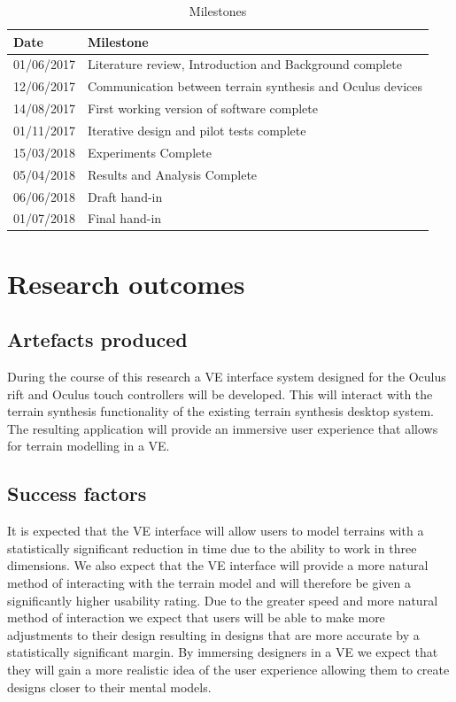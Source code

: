 \documentclass{sig-alternate-05-2015}
\begin{document}
\begin{table}[H]
	\centering
	\begin{tabular}{m{2cm} |m{4cm}}
		Date & Milestone\\ \hline
		01/06/2017 & Literature review, Introduction and Background complete\\
		12/06/2017 & Communication between terrain synthesis and Oculus devices\\
		14/08/2017 & First working version of software complete\\
		01/11/2017 & Iterative design and pilot tests complete \\
		15/03/2018 & Experiments Complete\\
		05/04/2018 & Results and Analysis Complete\\
		06/06/2018 & Draft hand-in\\
		01/07/2018 & Final hand-in		
	\end{tabular}
\caption{Milestones}
\end{table}
\section{Research outcomes}
\subsection{Artefacts produced}
During the course of this research a VE interface system designed for the Oculus rift and Oculus touch controllers will be developed. This will interact with the terrain synthesis functionality of the existing terrain synthesis desktop system\cite{Gain2015}. The resulting application will provide an immersive user experience that allows for terrain modelling in a VE.
\newpage
\subsection{Success factors}
It is expected that the VE interface will allow users to model terrains with a statistically significant reduction in time due to the ability to work in three dimensions. We also expect that the VE interface will provide a more natural method of interacting with the terrain model and will therefore be given a significantly higher usability rating. Due to the greater speed and more natural method of interaction we expect that users will be able to make more adjustments to their design resulting in designs that are more accurate by a statistically significant margin. By immersing designers in a VE we expect that they will gain a more realistic idea of the user experience allowing them to create designs closer to their mental models.
\end{document}
